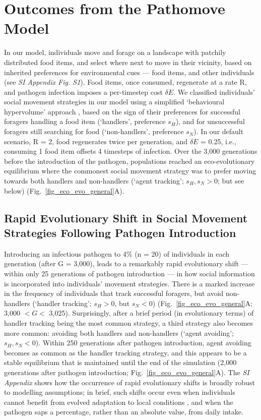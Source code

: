 \section*{Outcomes from the Pathomove Model}

In our model, individuals move and forage on a landscape with patchily distributed food items, and select where next to move in their vicinity, based on inherited preferences for environmental cues --- food items, and other individuals (see \textit{SI Appendix Fig. S1}).
Food items, once consumed, regenerate at a rate R, and pathogen infection imposes a per-timestep cost $\delta E$.
We classified individuals' social movement strategies in our model using a simplified `behavioural hypervolume' approach \autocite{bastille-rousseau2019}, based on the sign of their preferences for successful foragers handling a food item (`handlers', preference $s_H$), and for unsuccessful foragers still searching for food (`non-handlers', preference $s_N$).
In our default scenario, R = 2, food regenerates twice per generation, and $\delta E$ = 0.25, i.e., consuming 1 food item offsets 4 timesteps of infection. 
Over the 3,000 generations before the introduction of the pathogen, populations reached an eco-evolutionary equilibrium where the commonest social movement strategy was to prefer moving towards both handlers and non-handlers (`agent tracking'; $s_H, s_N > 0$; but see below) (Fig.~\ref{fig_eco_evo_general}A).

\subsection*{Rapid Evolutionary Shift in Social Movement Strategies Following Pathogen Introduction}

Introducing an infectious pathogen to 4\% (n = 20) of individuals in each generation (after G = 3,000), leads to a remarkably rapid evolutionary shift --- within only 25 generations of pathogen introduction --- in how social information is incorporated into individuals' movement strategies.
There is a marked increase in the frequency of individuals that track successful foragers, but avoid non-handlers (`handler tracking'; $s_H > 0$, but $s_N < 0$) (Fig.~\ref{fig_eco_evo_general}A; 3,000 $< G <$ 3,025).
Surprisingly, after a brief period (in evolutionary terms) of handler tracking being the most common strategy, a third strategy also becomes more common: avoiding both handlers and non-handlers (`agent avoiding'; $s_H, s_N < 0$).
Within 250 generations after pathogen introduction, agent avoiding becomes as common as the handler tracking strategy, and this appears to be a stable equilibrium that is maintained until the end of the simulation (2,000 generations after pathogen introduction; Fig.~\ref{fig_eco_evo_general}A).
The \textit{SI Appendix} shows how the occurrence of rapid evolutionary shifts is broadly robust to modelling assumptions; in brief, such shifts occur even when individuals cannot benefit from evolved adaptation to local conditions \autocite{badyaev2009}, and when the pathogen saps a percentage, rather than an absolute value, from daily intake.

